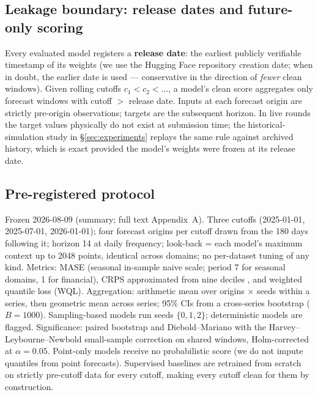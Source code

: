 \documentclass{article}
\begin{document}
\subsection{Leakage boundary: release dates and future-only scoring}

Every evaluated model registers a \textbf{release date}: the earliest publicly verifiable timestamp of its weights (we use the Hugging Face repository creation date; when in doubt, the earlier date is used --- conservative in the direction of \emph{fewer} clean windows). Given rolling cutoffs $c_1 < c_2 < \dots$, a model's clean score aggregates only forecast windows with cutoff $>$ release date. Inputs at each forecast origin are strictly pre-origin observations; targets are the subsequent horizon. In live rounds the target values physically do not exist at submission time; the historical-simulation study in \S\ref{sec:experiments} replays the same rule against archived history, which is exact provided the model's weights were frozen at its release date.

\subsection{Pre-registered protocol}\label{sec:protocol}

Frozen 2026-08-09 (summary; full text Appendix~A). Three cutoffs (2025-01-01, 2025-07-01, 2026-01-01); four forecast origins per cutoff drawn from the 180 days following it; horizon 14 at daily frequency; look-back = each model's maximum context up to 2048 points, identical across domains; no per-dataset tuning of any kind. Metrics: MASE \citep{hyndman2006mase} (seasonal in-sample naive scale; period 7 for seasonal domains, 1 for financial), CRPS approximated from nine deciles \citep{gneiting2007crps}, and weighted quantile loss (WQL). Aggregation: arithmetic mean over origins $\times$ seeds within a series, then geometric mean across series; 95\% CIs from a cross-series bootstrap ($B{=}1000$). Sampling-based models run seeds $\{0,1,2\}$; deterministic models are flagged. Significance: paired bootstrap and Diebold--Mariano \citep{diebold1995dm} with the Harvey--Leybourne--Newbold small-sample correction \citep{harvey1997hln} on shared windows, Holm-corrected \citep{holm1979} at $\alpha{=}0.05$. Point-only models receive no probabilistic score (we do not impute quantiles from point forecasts). Supervised baselines are retrained from scratch on strictly pre-cutoff data for every cutoff, making every cutoff clean for them by construction.
\end{document}
